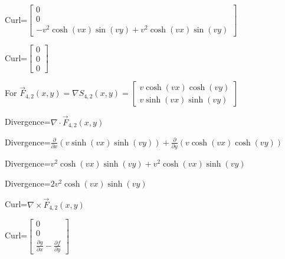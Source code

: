 \documentclass[12pt, executivepaper]{article}
\begin{document}
\begin{flushleft}
\vspace{3mm}

Curl=$\begin{bmatrix}
0 \\
0 \\
-v^2\cosh(vx)\sin(vy)+v^2\cosh(vx)\sin(vy)
\end{bmatrix}$ \\

\vspace{3mm}

Curl=$\begin{bmatrix}
0 \\
0 \\
0
\end{bmatrix}$ \\

\vspace{5mm}

For $\vec F_{4,2}(x,y)=\nabla S_{4,2}(x,y)=
\begin{bmatrix}
v\cosh(vx)\cosh(vy) \\
v\sinh(vx)\sinh(vy)
\end{bmatrix}$

\vspace{3mm}

Divergence=$\nabla \cdot \vec F_{4,2}(x,y)$ \\

\vspace{3mm}

Divergence=$\frac{\partial}{\partial x}(v\sinh(vx)\sinh(vy))+\frac{\partial}{\partial y}(v\cosh(vx)\cosh(vy))$ \\

\vspace{3mm}

Divergence=$v^2\cosh(vx)\sinh(vy)+v^2\cosh(vx)\sinh(vy)$ \\

\vspace{3mm}

Divergence=$2v^2\cosh(vx)\sinh(vy)$ \\

\vspace{3mm}

Curl=$\nabla \times \vec F_{4,2}(x,y)$ \\

\vspace{3mm}

Curl=$\begin{bmatrix}
0 \\
0 \\
\frac{\partial g}{\partial x}-\frac{\partial f}{\partial y}
\end{bmatrix}$ \\


\end{flushleft}
\end{document}
